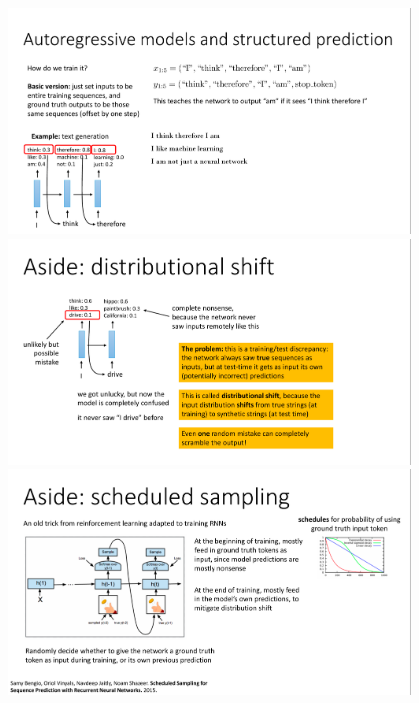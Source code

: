 \documentclass{book}
\begin{document}
\begin{figure}[H]
    \centering
    \includegraphics[width=0.95\textwidth]{images/lec10_19.png}
    \includegraphics[width=0.95\textwidth]{images/lec10_20.png}
    \includegraphics[width=0.95\textwidth]{images/lec10_21.png}
\end{figure}
\end{document}
